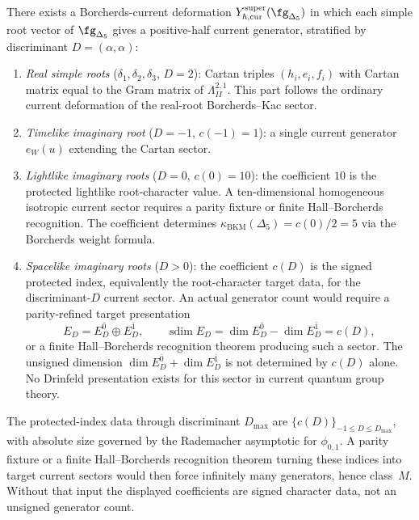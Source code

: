 \begin{conjecture}
\label{conj:bkm-yangian-generators}
\ClaimStatusConjectured
There exists a Borcherds-current deformation
$Y_{\hbar,\mathrm{cur}}^{\mathrm{super}}(\fg_{\Delta_5})$ in which
each simple root vector of $\fg_{\Delta_5}$ gives a positive-half
current generator, stratified by discriminant $D = (\alpha, \alpha)$:
\begin{enumerate}[label=\textup{(\roman*)}]
 \item \emph{Real simple roots} ($\delta_1, \delta_2, \delta_3$, $D = 2$): Cartan triples $(h_i, e_i, f_i)$ with Cartan matrix equal to the Gram matrix of $\Lambda^{2,1}_{II}$. This part follows the ordinary current deformation of the real-root Borcherds--Kac sector.

 \item \emph{Timelike imaginary root} ($D = -1$, $c(-1) = 1$): a single current generator $e_W(u)$ extending the Cartan sector.

 \item \emph{Lightlike imaginary roots} ($D = 0$, $c(0) = 10$): the coefficient $10$ is the protected lightlike root-character value. A ten-dimensional homogeneous isotropic current sector requires a parity fixture or finite Hall--Borcherds recognition. The coefficient determines $\kappa_{\mathrm{BKM}}(\Delta_5) = c(0)/2 = 5$ via the Borcherds weight formula.

 \item \emph{Spacelike imaginary roots} ($D > 0$): the coefficient $c(D)$ is the signed protected index, equivalently the root-character target data, for the discriminant-$D$ current sector. An actual generator count would require a parity-refined target presentation
 \[
  E_D = E_D^{\bar 0}\oplus E_D^{\bar 1},
  \qquad
  \operatorname{sdim} E_D
  = \dim E_D^{\bar 0}-\dim E_D^{\bar 1}
  = c(D),
 \]
 or a finite Hall--Borcherds recognition theorem producing such a sector. The unsigned dimension $\dim E_D^{\bar 0}+\dim E_D^{\bar 1}$ is not determined by $c(D)$ alone. No Drinfeld presentation exists for this sector in current quantum group theory.
\end{enumerate}
The protected-index data through discriminant $D_{\max}$ are
$\{c(D)\}_{-1 \leq D \leq D_{\max}}$, with absolute size governed by the
Rademacher asymptotic for $\phi_{0,1}$. A parity fixture or a finite
Hall--Borcherds recognition theorem turning these indices into target
current sectors would then force infinitely many generators, hence
class~$M$. Without that input the displayed coefficients are signed
character data, not an unsigned generator count.
\end{conjecture}

